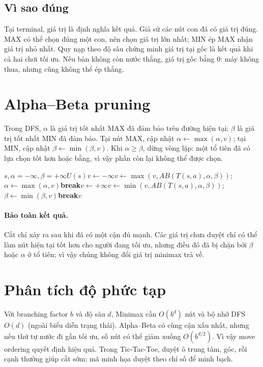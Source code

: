 \documentclass[conference]{IEEEtran}
\begin{document}
\subsection{Vì sao đúng}Tại terminal, giá trị là định nghĩa kết quả. Giả sử các nút con đã có giá trị đúng. MAX có thể chọn đúng một con, nên chọn giá trị lớn nhất; MIN ép MAX nhận giá trị nhỏ nhất. Quy nạp theo độ sâu chứng minh giá trị tại gốc là kết quả khi cả hai chơi tối ưu. Nếu bàn không còn nước thắng, giá trị gốc bằng $0$: máy không thua, nhưng cũng không thể ép thắng.
\section{Alpha--Beta pruning}Trong DFS, $\alpha$ là giá trị tốt nhất MAX đã đảm bảo trên đường hiện tại; $\beta$ là giá trị tốt nhất MIN đã đảm bảo. Tại nút MAX, cập nhật $\alpha\leftarrow\max(\alpha,v)$; tại MIN, cập nhật $\beta\leftarrow\min(\beta,v)$. Khi $\alpha\ge\beta$, dừng vòng lặp: một tổ tiên đã có lựa chọn tốt hơn hoặc bằng, vì vậy phần còn lại không thể được chọn.\begin{algorithm}[h]\caption{Alpha--Beta}\begin{algorithmic}[1]\Require $s,\alpha=-\infty,\beta=+\infty$\State \Return $U(s)$\EndIf{}\State $v\gets-\infty$\State $v\gets\max(v,AB(T(s,a),\alpha,\beta))$; $\alpha\gets\max(\alpha,v)$\If{$\alpha\ge\beta$}\State \textbf{break}\EndIf\EndFor\Else\State $v\gets+\infty$\State $v\gets\min(v,AB(T(s,a),\alpha,\beta))$; $\beta\gets\min(\beta,v)$\If{$\alpha\ge\beta$}\State \textbf{break}\EndIf\EndFor\EndIf\State \Return $v$\end{algorithmic}\end{algorithm}
\paragraph{Bảo toàn kết quả.} Cắt chỉ xảy ra sau khi đã có một cận đủ mạnh. Các giá trị chưa duyệt chỉ có thể làm nút hiện tại tốt hơn cho người đang tối ưu, nhưng điều đó đã bị chặn bởi $\beta$ hoặc $\alpha$ ở tổ tiên; vì vậy chúng không đổi giá trị minimax trả về.
\section{Phân tích độ phức tạp}Với branching factor $b$ và độ sâu $d$, Minimax cần $O(b^d)$ nút và bộ nhớ DFS $O(d)$ (ngoài biểu diễn trạng thái). Alpha--Beta có cùng cận xấu nhất, nhưng nếu thứ tự nước đi gần tối ưu, số nút có thể giảm xuống $O(b^{d/2})$. Vì vậy move ordering quyết định hiệu quả. Trong Tic-Tac-Toe, duyệt ô trung tâm, góc, rồi cạnh thường giúp cắt sớm; mã minh họa duyệt theo chỉ số để minh bạch.
\end{document}
